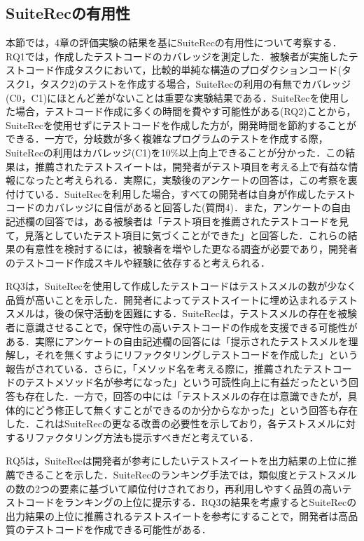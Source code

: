 \documentclass[12pt]{jarticle} %
\begin{document}
\subsection{SuiteRecの有用性}
本節では，4章の評価実験の結果を基に{\sf SuiteRec}の有用性について考察する．RQ1では，作成したテストコードのカバレッジを測定した．被験者が実施したテストコード作成タスクにおいて，比較的単純な構造のプロダクションコード(タスク1，タスク2)のテストを作成する場合，{\sf SuiteRec}の利用の有無でカバレッジ(C0，C1)にほとんど差がないことは重要な実験結果である．{\sf SuiteRec}を使用した場合，テストコード作成に多くの時間を費やす可能性がある(RQ2)ことから，{\sf SuiteRec}を使用せずにテストコードを作成した方が，開発時間を節約することができる．一方で，分岐数が多く複雑なプログラムのテストを作成する際，{\sf SuiteRec}の利用はカバレッジ(C1)を10\%以上向上できることが分かった．この結果は，推薦されたテストスイートは，開発者がテスト項目を考える上で有益な情報になったと考えられる．実際に，実験後のアンケートの回答は，この考察を裏付けている．{\sf SuiteRec}を利用した場合，すべての開発者は自身が作成したテストコードのカバレッジに自信があると回答した(質問4)．また，アンケートの自由記述欄の回答では，ある被験者は「テスト項目を推薦されたテストコードを見て，見落としていたテスト項目に気づくことができた」と回答した．これらの結果の有意性を検討するには，被験者を増やした更なる調査が必要であり，開発者のテストコード作成スキルや経験に依存すると考えられる．

RQ3は，{\sf SuiteRec}を使用して作成したテストコードはテストスメルの数が少なく品質が高いことを示した．開発者によってテストスイートに埋め込まれるテストスメルは，後の保守活動を困難にする．{\sf SuiteRec}は，テストスメルの存在を被験者に意識させることで，保守性の高いテストコードの作成を支援できる可能性がある．実際にアンケートの自由記述欄の回答には「提示されたテストスメルを理解し，それを無くすようにリファクタリングしテストコードを作成した」という報告がされている．さらに，「メソッド名を考える際に，推薦されたテストコードのテストメソッド名が参考になった」という可読性向上に有益だったという回答も存在した．一方で，回答の中には「テストスメルの存在は意識できたが，具体的にどう修正して無くすことができるのか分からなかった」という回答も存在した．これは{\sf SuiteRec}の更なる改善の必要性を示しており，各テストスメルに対するリファクタリング方法も提示すべきだと考えている．

RQ5は，{\sf SuiteRec}は開発者が参考にしたいテストスイートを出力結果の上位に推薦できることを示した．{\sf SuiteRec}のランキング手法では，類似度とテストスメルの数の2つの要素に基づいて順位付けされており，再利用しやすく品質の高いテストコードをランキングの上位に提示する．RQ3の結果を考慮すると{\sf SuiteRec}の出力結果の上位に推薦されるテストスイートを参考にすることで，開発者は高品質のテストコードを作成できる可能性がある．
\end{document}
